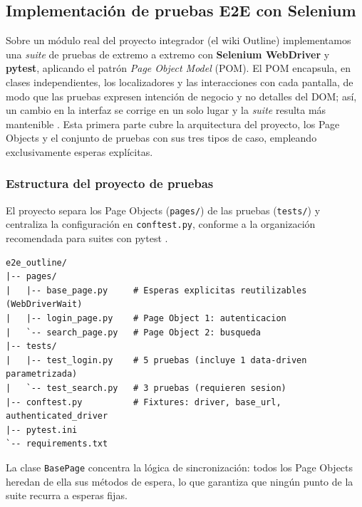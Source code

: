 \documentclass[12pt]{article}
\begin{document}
\setcounter{subsection}{2}
\subsection{Implementación de pruebas E2E con Selenium}
\label{sec:4-3}

Sobre un módulo real del proyecto integrador (el wiki Outline) implementamos una
\textit{suite} de pruebas de extremo a extremo con \textbf{Selenium WebDriver} y
\textbf{pytest}, aplicando el patrón \textit{Page Object Model} (POM). El POM
encapsula, en clases independientes, los localizadores y las interacciones con
cada pantalla, de modo que las pruebas expresen intención de negocio y no
detalles del DOM; así, un cambio en la interfaz se corrige en un solo lugar y la
\textit{suite} resulta más mantenible \citep{garcia2022, khorikov2020}. Esta
primera parte cubre la arquitectura del proyecto, los Page Objects y el conjunto
de pruebas con sus tres tipos de caso, empleando exclusivamente esperas
explícitas.

\subsubsection{Estructura del proyecto de pruebas}

El proyecto separa los Page Objects (\texttt{pages/}) de las pruebas
(\texttt{tests/}) y centraliza la configuración en \texttt{conftest.py}, conforme
a la organización recomendada para suites con pytest \citep{pytestdocs}.

\begin{lstlisting}[style=tree,caption={Estructura de directorios de la suite E2E.},captionpos=b]
e2e_outline/
|-- pages/
|   |-- base_page.py     # Esperas explicitas reutilizables (WebDriverWait)
|   |-- login_page.py    # Page Object 1: autenticacion
|   `-- search_page.py   # Page Object 2: busqueda
|-- tests/
|   |-- test_login.py    # 5 pruebas (incluye 1 data-driven parametrizada)
|   `-- test_search.py   # 3 pruebas (requieren sesion)
|-- conftest.py          # Fixtures: driver, base_url, authenticated_driver
|-- pytest.ini
`-- requirements.txt
\end{lstlisting}

La clase \texttt{BasePage} concentra la lógica de sincronización: todos los Page
Objects heredan de ella sus métodos de espera, lo que garantiza que ningún punto
de la suite recurra a esperas fijas.
\end{document}
